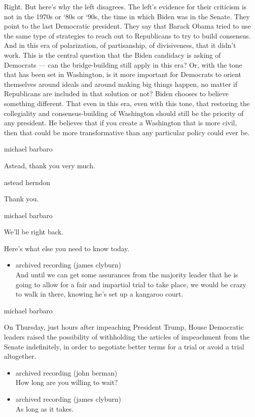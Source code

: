 Right. But here's why the left disagrees. The left's evidence for their
criticism is not in the 1970s or `80s or `90s, the time in which Biden
was in the Senate. They point to the last Democratic president. They say
that Barack Obama tried to use the same type of strategies to reach out
to Republicans to try to build consensus. And in this era of
polarization, of partisanship, of divisiveness, that it didn't work.
This is the central question that the Biden candidacy is asking of
Democrats --- can the bridge-building still apply in this era? Or, with
the tone that has been set in Washington, is it more important for
Democrats to orient themselves around ideals and around making big
things happen, no matter if Republicans are included in that solution or
not? Biden chooses to believe something different. That even in this
era, even with this tone, that restoring the collegiality and
consensus-building of Washington should still be the priority of any
president. He believes that if you create a Washington that is more
civil, then that could be more transformative than any particular policy
could ever be.

michael barbaro

Astead, thank you very much.

astead herndon

Thank you.

michael barbaro

We'll be right back.

Here's what else you need to know today.

\begin{itemize}
\tightlist
\item
  archived recording (james clyburn)\\
  And until we can get some assurances from the majority leader that he
  is going to allow for a fair and impartial trial to take place, we
  would be crazy to walk in there, knowing he's set up a kangaroo court.
\end{itemize}

michael barbaro

On Thursday, just hours after impeaching President Trump, House
Democratic leaders raised the possibility of withholding the articles of
impeachment from the Senate indefinitely, in order to negotiate better
terms for a trial or avoid a trial altogether.

\begin{itemize}
\item
  archived recording (john berman)\\
  How long are you willing to wait?
\item
  archived recording (james clyburn)\\
  As long as it takes.
\end{itemize}

